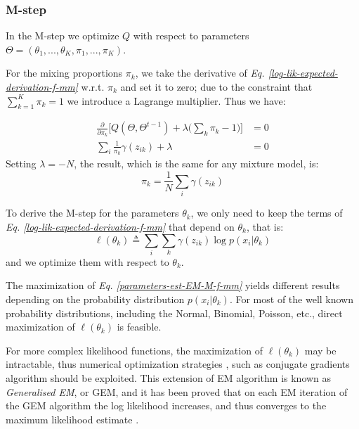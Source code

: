 \subsubsection{M-step}
In the M-step we optimize $Q$ with respect to parameters $\Theta = (\theta_{1},...,\theta_{K},\pi_{1},...,\pi_{K})$.

For the mixing proportions $\pi_{k}$, we take the derivative of \emph{Eq. \ref{log-lik-expected-derivation-f-mm}} w.r.t. $\pi_{k}$ and set it to zero; due to the constraint that $\sum_{k=1}^{K}\pi_{k} = 1$ we introduce a Lagrange multiplier. Thus we have:

\begin{equation} \label{derivative-mix-prop-f-mm}
  \begin{aligned}
	\frac{\partial}{\partial \pi_{k}} \bigg[  Q(\Theta, \Theta^{t-1}) + \lambda \big( \sum_{k}\pi_{k} - 1\big) \bigg] & = 0 \\
	\sum_{i} \frac{1}{\pi_{k}} \gamma(z_{ik}) + \lambda & = 0 
  \end{aligned}
\end{equation}
Setting $\lambda = - N$, the result, which is the same for any mixture model, is:
\begin{equation} \label{mixing-proportions-est-f-mm}
		\pi_{k} = \frac{1}{N} \sum_{i} \gamma(z_{ik})
\end{equation}

To derive the M-step for the parameters $\theta_{k}$, we only need to keep the terms of \emph{Eq. \ref{log-lik-expected-derivation-f-mm}} that depend on $\theta_{k}$, that is:
\begin{equation} \label{parameters-est-EM-M-f-mm}
		\ell(\theta_{k}) \triangleq \sum_{i} \sum_{k} \gamma(z_{ik}) \log p(x_{i}|\theta_{k})
\end{equation}
and we optimize them with respect to $\theta_{k}$.

The maximization of \emph{Eq. \ref{parameters-est-EM-M-f-mm}} yields different results depending on the probability distribution $p(x_{i}|\theta_{k})$. For most of the well known probability distributions, including the Normal, Binomial, Poisson, etc., direct maximization of $\ell(\theta_{k})$ is feasible. 

For more complex likelihood functions, the maximization of $\ell(\theta_{k})$ may be intractable, thus numerical optimization strategies \citep{Nocedal2006}, such as conjugate gradients algorithm \citep{Hestenes1952} should be exploited. This extension of EM algorithm is known as \emph{Generalised EM}, or GEM, and it has been proved that on each EM iteration of the GEM algorithm the log likelihood increases, and thus converges to the maximum likelihood estimate \citep{Wu1983}.